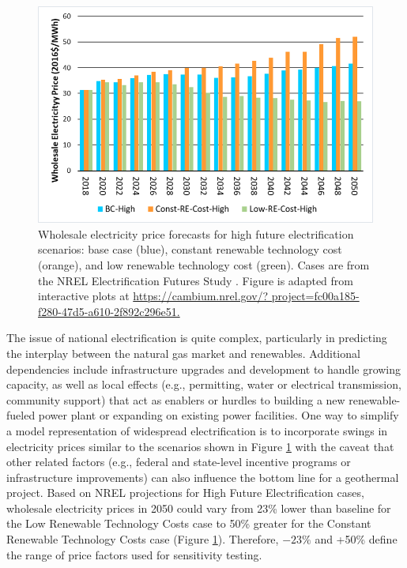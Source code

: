 \begin{figure}
\centering
\includegraphics[scale=0.65]{templates/images/Figure-EFS_SIPA_Results.png}
\singlespacing
\caption[Electrification price impact]{Wholesale electricity price forecasts for high future electrification scenarios: base case (blue), constant renewable technology cost (orange), and low renewable technology cost (green). Cases are from the NREL Electrification Futures Study \protect\citep{murphy_electrification_2021}. Figure is adapted from interactive plots at \url{https://cambium.nrel.gov/? project=fc00a185-f280-47d5-a610-2f892c296e51.}}
\label{fig:EFS_electricification}
\end{figure}
The issue of national electrification is quite complex, particularly in predicting the interplay between the natural gas market and renewables. Additional dependencies include infrastructure upgrades and development to handle growing capacity, as well as local effects (e.g., permitting, water or electrical transmission, community support) that act as enablers or hurdles to building a new renewable-fueled power plant or expanding on existing power facilities. One way to simplify a model representation of widespread electrification is to incorporate swings in electricity prices similar to the scenarios shown in Figure \ref{fig:EFS_electricification} with the caveat that other related factors (e.g., federal and state-level incentive programs or infrastructure improvements) can also influence the bottom line for a geothermal project. Based on NREL projections for High Future Electrification cases, wholesale electricity prices in 2050 could vary from 23\% lower than baseline for the Low Renewable Technology Costs case to 50\% greater for the Constant Renewable Technology Costs case (Figure \ref{fig:EFS_electricification}). Therefore, $-23\%$ and +50\% define the range of price factors used for sensitivity testing.


